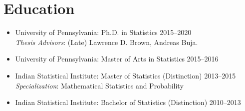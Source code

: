 \documentclass[10pt]{article}
\numberwithin{myalgctr}{section}
\begin{document}
\section*{Education}
\begin{itemize}\itemsep0em
    \item University of Pennsylvania: Ph.D. in Statistics \hfill 2015--2020\\  \hspace*{1.02cm}\textit{Thesis Advisors}: (Late) Lawrence D. Brown, Andreas Buja.
    \item University of Pennsylvania: Master of Arts in Statistics \hfill 2015--2016
    \item Indian Statistical Institute: Master of Statistics (Distinction) \hfill 2013--2015\\
    \hspace*{1.3cm}\textit{Specialization}: Mathematical Statistics and Probability
    \item Indian Statistical Institute: Bachelor of Statistics (Distinction) \hfill 2010--2013
\end{itemize}
\vspace{-0.1in}

\end{document}
